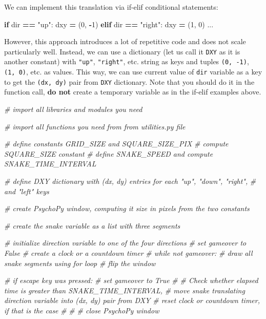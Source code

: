 \documentclass[
]{book}
\newenvironment{Shaded}{\begin{snugshade}}{\end{snugshade}}
\newcommand{\BuiltInTok}[1]{#1}
\newcommand{\CommentTok}[1]{\textcolor[rgb]{0.56,0.35,0.01}{\textit{#1}}}
\newcommand{\ControlFlowTok}[1]{\textcolor[rgb]{0.13,0.29,0.53}{\textbf{#1}}}
\newcommand{\DecValTok}[1]{\textcolor[rgb]{0.00,0.00,0.81}{#1}}
\newcommand{\NormalTok}[1]{#1}
\newcommand{\OperatorTok}[1]{\textcolor[rgb]{0.81,0.36,0.00}{\textbf{#1}}}
\newcommand{\StringTok}[1]{\textcolor[rgb]{0.31,0.60,0.02}{#1}}
\begin{document}
We can implement this translation via if-elif conditional statements:

\begin{Shaded}
\begin{Highlighting}[]
\ControlFlowTok{if} \BuiltInTok{dir} \OperatorTok{==} \StringTok{"up"}\NormalTok{:}
\NormalTok{  dxy }\OperatorTok{=}\NormalTok{ (}\DecValTok{0}\NormalTok{, }\OperatorTok{{-}}\DecValTok{1}\NormalTok{)}
\ControlFlowTok{elif} \BuiltInTok{dir} \OperatorTok{==} \StringTok{"right"}\NormalTok{:}
\NormalTok{  dxy }\OperatorTok{=}\NormalTok{ (}\DecValTok{1}\NormalTok{, }\DecValTok{0}\NormalTok{)}
\NormalTok{  ...}
\end{Highlighting}
\end{Shaded}

However, this approach introduces a lot of repetitive code and does not scale particularly well. Instead, we can use a dictionary (let us call it \texttt{DXY} as it is another constant) with \texttt{"up"}, \texttt{"right"}, etc. string as keys and tuples \texttt{(0,\ -1)}, \texttt{(1,\ 0)}, etc. as values. This way, we can use current value of \texttt{dir} variable as a key to get the \texttt{(dx,\ dy)} pair from \texttt{DXY} dictionary. Note that you should do it in the function call, \textbf{do not} create a temporary variable as in the if-elif examples above.

\begin{Shaded}
\begin{Highlighting}[]
\CommentTok{\# import all libraries and modules you need}

\CommentTok{\# import all functions you need from from utilities.py file}

\CommentTok{\# define constants GRID\_SIZE and SQUARE\_SIZE\_PIX}
\CommentTok{\# compute SQUARE\_SIZE constant}
\CommentTok{\# define SNAKE\_SPEED and compute SNAKE\_TIME\_INTERVAL}

\CommentTok{\# define DXY dictionary with (dx, dy) entries for each "up", "down", "right",}
\CommentTok{\#     and "left" keys}

\CommentTok{\# create PsychoPy window, computing it size in pixels from the two constants}

\CommentTok{\# create the snake variable as a list with three segments}

\CommentTok{\# initialize direction variable to one of the four directions}
\CommentTok{\# set gameover to False}
\CommentTok{\# create a clock or a countdown timer}
\CommentTok{\# while not gameover:}
\CommentTok{\#     draw all snake segments using for loop  }
\CommentTok{\#     flip the window}

\CommentTok{\#     if escape key was pressed:}
\CommentTok{\#         set gameover to True}
\CommentTok{\#}
\CommentTok{\#     Check whether elapsed time is greater than SNAKE\_TIME\_INTERVAL, }
\CommentTok{\#         move snake translating direction variable into (dx, dy) pair from DXY}
\CommentTok{\#         reset clock or countdown timer, if that is the case}
\CommentTok{\#}
\CommentTok{\#}
\CommentTok{\# close PsychoPy window}
\end{Highlighting}
\end{Shaded}
\end{document}
